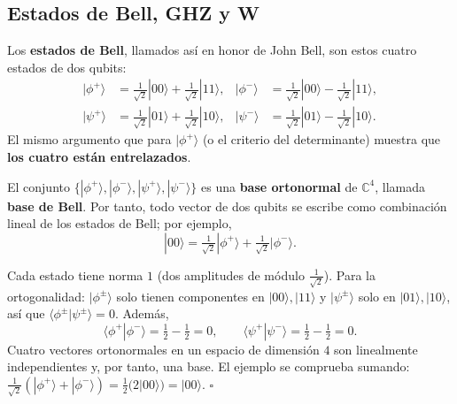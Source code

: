 \documentclass[11pt, a4paper, twoside, openright]{report}
\begin{document}
\subsection{Estados de Bell, GHZ y W}

\noindent Los \textbf{estados de Bell}, llamados así en honor de John Bell, son estos cuatro estados de dos qubits:
\begin{align*}
|\phi^+\rangle &= \tfrac{1}{\sqrt2}|00\rangle + \tfrac{1}{\sqrt2}|11\rangle, &
|\phi^-\rangle &= \tfrac{1}{\sqrt2}|00\rangle - \tfrac{1}{\sqrt2}|11\rangle, \\
|\psi^+\rangle &= \tfrac{1}{\sqrt2}|01\rangle + \tfrac{1}{\sqrt2}|10\rangle, &
|\psi^-\rangle &= \tfrac{1}{\sqrt2}|01\rangle - \tfrac{1}{\sqrt2}|10\rangle.
\end{align*}
El mismo argumento que para $|\phi^+\rangle$ (o el criterio del determinante) muestra que \textbf{los cuatro están entrelazados}.

\begin{tcolorbox}[colback=teal!5!white,colframe=teal!75!black,title=\textbf{Proposición: La base de Bell}]
El conjunto $\{|\phi^+\rangle, |\phi^-\rangle, |\psi^+\rangle, |\psi^-\rangle\}$ es una \textbf{base ortonormal} de $\mathbb{C}^4$, llamada \textbf{base de Bell}. Por tanto, todo vector de dos qubits se escribe como combinación lineal de los estados de Bell; por ejemplo,
\[ |00\rangle = \tfrac{1}{\sqrt2}|\phi^+\rangle + \tfrac{1}{\sqrt2}|\phi^-\rangle. \]
\end{tcolorbox}

\begin{tcolorbox}[colback=gray!5!white,colframe=gray!75!black,title=\textbf{Demostración}]
Cada estado tiene norma $1$ (dos amplitudes de módulo $\frac{1}{\sqrt2}$). Para la ortogonalidad: $|\phi^\pm\rangle$ solo tienen componentes en $|00\rangle, |11\rangle$ y $|\psi^\pm\rangle$ solo en $|01\rangle, |10\rangle$, así que $\langle\phi^\pm|\psi^\pm\rangle = 0$. Además,
\[ \langle\phi^+|\phi^-\rangle = \tfrac12 - \tfrac12 = 0, \qquad \langle\psi^+|\psi^-\rangle = \tfrac12 - \tfrac12 = 0. \]
Cuatro vectores ortonormales en un espacio de dimensión $4$ son linealmente independientes y, por tanto, una base. El ejemplo se comprueba sumando: $\frac{1}{\sqrt2}(|\phi^+\rangle + |\phi^-\rangle) = \frac12\big(2|00\rangle\big) = |00\rangle$. \hfill $\square$
\end{tcolorbox}
\end{document}
